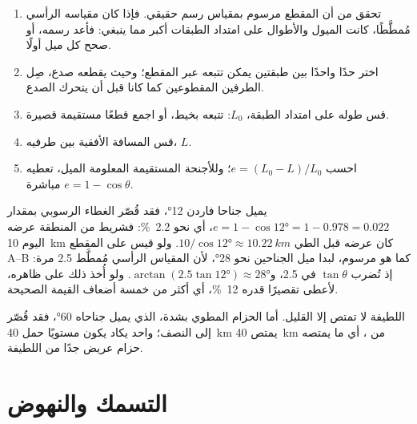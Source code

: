 \begin{method}\label{met:g12:mountain-building:shortening}
\begin{enumerate}
  \item تحقق من أن المقطع مرسوم بمقياس رسم حقيقي. فإذا كان مقياسه الرأسي
        مُمطَّطًا، كانت الميول والأطوال على امتداد الطبقات أكبر مما ينبغي: فأعد رسمه،
        أو صحح كل ميل أولًا.
  \item اختر حدًا واحدًا بين طبقتين يمكن تتبعه عبر المقطع؛
        وحيث يقطعه صدع، صِل الطرفين المقطوعين كما كانا قبل أن
        يتحرك الصدع.
  \item قس طوله على امتداد الطبقة، $L_0$: تتبعه بخيط،
        أو اجمع قطعًا مستقيمة قصيرة.
  \item قس المسافة الأفقية بين طرفيه، $L$.
  \item احسب $e = (L_0 - L)/L_0$؛ وللأجنحة المستقيمة المعلومة الميل،
        تعطيه $e = 1 - \cos\theta$ مباشرة.
\end{enumerate}
\end{method}

\begin{example}\label{ex:g12:mountain-building:varden}
يميل جناحا  فاردن \ang{12}، فقد قُصّر الغطاء الرسوبي بمقدار
$e = 1 - \cos\ang{12} = 1 - 0.978 = 0.022$، أي نحو \qty{2.2}{\percent}:
فشريط من المنطقة عرضه اليوم \qty{10}{km} كان عرضه قبل الطي $10/\cos\ang{12} \approx
\qty{10.22}{km}$. ولو قيس على المقطع A--B كما هو مرسوم، لبدا ميل
الجناحين نحو \ang{28}، لأن المقياس الرأسي
مُمطَّط 2.5 مرة: إذ تُضرب $\tan\theta$ في 2.5، و$\arctan(2.5
\tan\ang{12}) \approx \ang{28}$. ولو أُخذ ذلك على ظاهره، لأعطى
تقصيرًا قدره \qty{12}{\percent}، أي أكثر من خمسة أضعاف القيمة الصحيحة.
\end{example}

 اللطيفة لا تمتص إلا القليل. أما الحزام المطوي بشدة، الذي يميل جناحاه
\ang{60}، فقد قُصّر إلى النصف؛  واحد يكاد يكون مستويًا
حمل  \qty{40}{km} يمتص \qty{40}{km} من ، أي ما
يمتصه حزام عريض جدًا من  اللطيفة.

\section{التسمك والنهوض}

